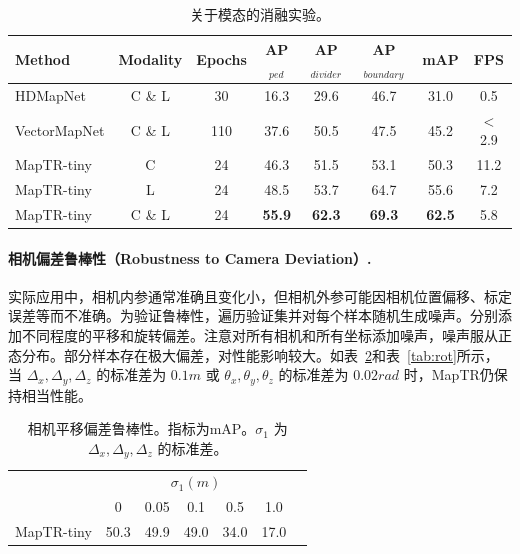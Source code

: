 \documentclass{article} %
\begin{document}
\begin{table}[ht!]
\begin{center}

\begin{tabular}{lcc|cccc|c}
\hline
\rowcolor{Gray}
Method & Modality & Epochs & AP$_{\textit{ped}}$ & AP$_{\textit{divider}}$ & AP$_{\textit{boundary}}$ & mAP & FPS \\
\toprule
HDMapNet & C \& L & 30 & 16.3 & 29.6 & 46.7 & 31.0 & 0.5\\
VectorMapNet & C \& L  & 110 & 37.6 & 50.5 & 47.5 & 45.2 & $<$2.9\\
\midrule
MapTR-tiny & C & 24 & \cellcolor{blue!10}46.3 & \cellcolor{blue!10}51.5 & \cellcolor{blue!10}53.1 & \cellcolor{blue!10}50.3& \cellcolor{blue!10}11.2\\
MapTR-tiny & L  &24 & 48.5 & 53.7  & 64.7 &55.6 &7.2\\
MapTR-tiny & C \& L  &24 & \textbf{55.9} & \textbf{62.3}  & \textbf{69.3} & \textbf{62.5} &5.8\\
\bottomrule
\end{tabular}

\end{center}
\vspace*{-0.45cm}
\caption{关于模态的消融实验。}
\label{tab:modality}
\vspace*{-0.35cm}
\end{table}

\paragraph{相机偏差鲁棒性（Robustness to Camera Deviation）.} 实际应用中，相机内参通常准确且变化小，但相机外参可能因相机位置偏移、标定误差等而不准确。为验证鲁棒性，遍历验证集并对每个样本随机生成噪声。分别添加不同程度的平移和旋转偏差。注意对所有相机和所有坐标添加噪声，噪声服从正态分布。部分样本存在极大偏差，对性能影响较大。如表~\ref{tab:trans}和表~\ref{tab:rot}所示，当 $\Delta_x, \Delta_y, \Delta_z$ 的标准差为 $0.1m$ 或 $\theta_x, \theta_y, \theta_z$ 的标准差为 $0.02rad$ 时，MapTR仍保持相当性能。

\begin{table}[t!]
\begin{center}
\begin{tabular}{l|cccccc}
\hline
\rowcolor{Gray}
 &  \multicolumn{5}{c}{  $\sigma_1 (m)$} \\
\rowcolor{Gray}
\multirow{-2}{*}{Method} &  0 &  0.05 &  0.1 &  0.5 &  1.0   \\
\toprule
MapTR-tiny & \cellcolor{blue!10}50.3& 49.9&49.0&34.0&17.0\\
\bottomrule
\end{tabular}
\end{center}
\vspace*{-0.45cm}
\caption{相机平移偏差鲁棒性。指标为mAP。$\sigma_1$ 为 $\Delta_x, \Delta_y, \Delta_z$ 的标准差。}
\label{tab:trans}
\vspace*{-0.35cm}
\end{table}
\end{document}
